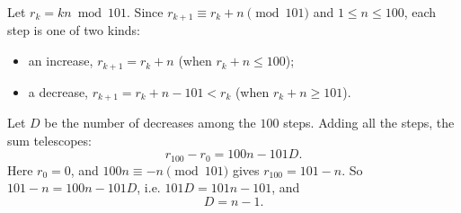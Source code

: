 Let $r_k=kn\bmod101$. Since $r_{k+1}\equiv r_k+n\pmod{101}$ and $1\le n\le100$, each step is one of two kinds:
\begin{itemize}
\item an increase, $r_{k+1}=r_k+n$ (when $r_k+n\le100$);
\item a decrease, $r_{k+1}=r_k+n-101<r_k$ (when $r_k+n\ge101$).
\end{itemize}
Let $D$ be the number of decreases among the $100$ steps. Adding all the steps, the sum telescopes:
\[r_{100}-r_0=100n-101D.\]
Here $r_0=0$, and $100n\equiv-n\pmod{101}$ gives $r_{100}=101-n$. So $101-n=100n-101D$, i.e. $101D=101n-101$, and
\[D=\boxed{n-1}.\]
